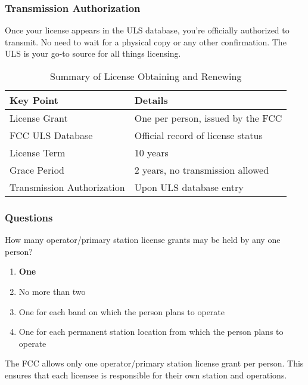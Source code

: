 \subsubsection*{Transmission Authorization}
Once your license appears in the ULS database, you're officially authorized to transmit. No need to wait for a physical copy or any other confirmation. The ULS is your go-to source for all things licensing.


\begin{table}[h]
    \centering
    \begin{tabular}{|l|l|}
        \hline
        \textbf{Key Point} & \textbf{Details} \\ \hline
        License Grant & One per person, issued by the FCC \\ \hline
        FCC ULS Database & Official record of license status \\ \hline
        License Term & 10 years \\ \hline
        Grace Period & 2 years, no transmission allowed \\ \hline
        Transmission Authorization & Upon ULS database entry \\ \hline
    \end{tabular}
    \caption{Summary of License Obtaining and Renewing}
    \label{tab:license-summary}
\end{table}

\subsubsection*{Questions}

\begin{tcolorbox}[colback=gray!10!white,colframe=black!75!black,title={T1A04}]
    How many operator/primary station license grants may be held by any one person?
    \begin{enumerate}[label=\Alph*),noitemsep]
        \item \textbf{One}
        \item No more than two
        \item One for each band on which the person plans to operate
        \item One for each permanent station location from which the person plans to operate
    \end{enumerate}
\end{tcolorbox}
The FCC allows only one operator/primary station license grant per person. This ensures that each licensee is responsible for their own station and operations.

